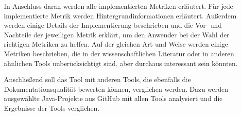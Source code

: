 In Anschluss daran werden alle implementierten Metriken erläutert. Für jede implementierte Metrik werden Hintergrundinformationen erläutert. Außerdem werden einige Details der Implementierung beschrieben und die Vor- und Nachteile der jeweiligen Metrik erklärt, um den Anwender bei der Wahl der richtigen Metriken zu helfen. Auf der gleichen Art und Weise werden einige Metriken beschrieben, die in der wissenschaftlichen Literatur oder in anderen ähnlichen Tools unberücksichtigt sind, aber durchaus interessant sein könnten. 

Anschließend soll das Tool mit anderen Tools, die ebenfalls die Dokumentationsqualität bewerten können, verglichen werden. Dazu werden ausgewählte Java-Projekte aus GitHub mit allen Tools analysiert und die Ergebnisse der Tools verglichen. 







